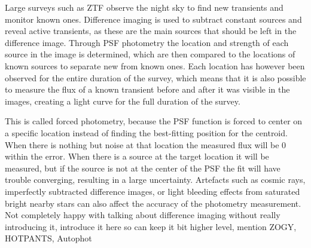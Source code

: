 \documentclass[a4paper,oneside,12pt, class=Latex/Classes/PhDthesisPSnPDF, crop=false]{standalone}
\begin{document}

Large surveys such as ZTF observe the night sky to find new transients and monitor known ones. Difference imaging is used to subtract constant sources and reveal active transients, as these are the main sources that should be left in the difference image. Through PSF photometry the location and strength of each source in the image is determined, which are then compared to the locations of known sources to separate new from known ones. Each location has however been observed for the entire duration of the survey, which means that it is also possible to measure the flux of a known transient before and after it was visible in the images, creating a light curve for the full duration of the survey.

This is called forced photometry, because the PSF function is forced to center on a specific location instead of finding the best-fitting position for the centroid. When there is nothing but noise at that location the measured flux will be 0 within the error. When there is a source at the target location it will be measured, but if the source is not at the center of the PSF the fit will have trouble converging, resulting in a large uncertainty. Artefacts such as cosmic rays, imperfectly subtracted difference images, or light bleeding effects from saturated bright nearby stars can also affect the accuracy of the photometry measurement. \color{red} Not completely happy with talking about difference imaging without really introducing it, introduce it here so can keep it bit higher level, mention ZOGY, HOTPANTS, Autophot \color{black}


\end{document}
